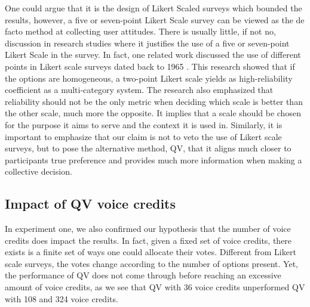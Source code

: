 One could argue that it is the design of Likert Scaled surveys which bounded the results, however,
a five or seven-point Likert Scale survey can be viewed as the de facto method at collecting user attitudes.
There is usually little, if not no, discussion in research studies where it justifies the use of a five or seven-point Likert Scale in the survey.
In fact, one related work discussed the use of different points in Likert scale surveys dated back to 1965 \cite{komorita1965number}. 
This research showed that if the options are homogeneous, a two-point Likert scale yields as high-reliability coefficient as a multi-category system.
The research also emphasized that reliability should not be the only metric when deciding which scale is better than the other scale, much more the opposite.
It implies that a scale should be chosen for the purpose it aims to serve and the context it is used in.
Similarly, it is important to emphasize that our claim is not to veto the use of Likert scale surveys, but to pose the alternative method, QV, that it aligns much closer to participants true preference and provides much more information when making a collective decision.\par

\subsection{Impact of QV voice credits}
In experiment one, we also confirmed our hypothesis that the number of voice credits does impact the results. 
In fact, given a fixed set of voice credits, there exists is a finite set of ways one could allocate their votes. 
Different from Likert scale surveys, the votes change according to the number of options present.
Yet, the performance of QV does not come through before reaching an excessive amount of voice credits, as we see that QV with 36 voice credits unperformed QV with 108 and 324 voice credits.

